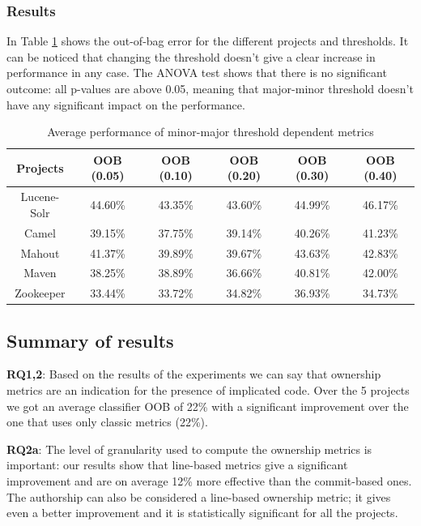 \subsubsection{Results}

In Table \ref{tab:resultexp2} shows the out-of-bag error for the different projects and thresholds. It can be noticed that changing the threshold doesn't give a clear increase in performance in any case. The ANOVA test shows that there is no significant outcome: all p-values are above 0.05, meaning that major-minor threshold doesn't have any significant impact on the performance.


\begin{table}[ht]
\centering
\caption{Average performance of minor-major threshold dependent metrics}
\label{tab:resultexp2}
\begin{tabular}{|c|c|c|c|c|c|}
\hline
\textbf{Projects} & \textbf{OOB (0.05)} & \textbf{OOB (0.10)} & \textbf{OOB (0.20)} & \textbf{OOB (0.30)} & \textbf{OOB (0.40)} \\
\hline
Lucene-Solr & 44.60\% & 43.35\% & 43.60\% & 44.99\% & 46.17\% \\
Camel & 39.15\% & 37.75\% & 39.14\% & 40.26\% & 41.23\% \\
Mahout & 41.37\% & 39.89\% & 39.67\% & 43.63\% & 42.83\% \\
Maven & 38.25\% & 38.89\% & 36.66\% & 40.81\% & 42.00\% \\
Zookeeper & 33.44\% & 33.72\% & 34.82\% & 36.93\% & 34.73\% \\
\hline
\end{tabular}
\end{table}


\subsection{Summary of results}


\textbf{RQ1,2}: Based on the results of the experiments we can say that ownership metrics are an indication for the presence of implicated code. Over the 5 projects we got an average classifier OOB of 22\% with a significant improvement over the one that uses only classic metrics (22\%).

\textbf{RQ2a}: The level of granularity used to compute the ownership metrics is important: our results show that line-based metrics give a significant improvement and are on average 12\% more effective than the commit-based ones. The authorship can also be considered a line-based ownership metric; it gives even a better improvement and it is statistically significant for all the projects. %

